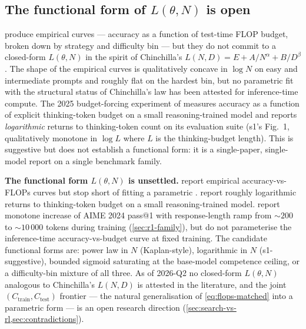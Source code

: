 \subsection{The functional form of \texorpdfstring{$L(\theta, N)$}{L(theta,N)} is open}
\label{sec:snell-open}

\citet{snell2024} produce empirical curves --- accuracy as a function
of test-time FLOP budget, broken down by strategy and difficulty bin
\citep[\S 5--6]{snell2024} --- but they do not commit to a closed-form
$L(\theta, N)$ in the spirit of Chinchilla's
$L(N, D) = E + A/N^\alpha + B/D^\beta$
\citep[\S 3, Eq.~2]{hoffmann2022-chinchilla}. The shape of the
empirical curves is qualitatively concave in $\log N$ on easy and
intermediate prompts and roughly flat on the hardest bin, but no
parametric fit with the structural status of Chinchilla's law has been
attested for inference-time compute. The 2025 budget-forcing experiment
of \citet{s1-2025} measures accuracy as a function of explicit
thinking-token budget on a small reasoning-trained model and reports
\emph{logarithmic} returns to thinking-token count on its evaluation
suite (s1's Fig.~1, qualitatively monotone in $\log L$ where $L$ is the
thinking-budget length). This is suggestive but does not establish a
functional form: it is a single-paper, single-model report on a single
benchmark family.

\begin{contradiction}
\textbf{The functional form $L(\theta, N)$ is unsettled.}
\citet{snell2024} report empirical accuracy-vs-FLOPs curves but stop
short of fitting a parametric . \citet{s1-2025} report
roughly logarithmic returns to thinking-token budget on a small
reasoning-trained model. \citet{deepseek-r1} report monotone increase
of AIME 2024 pass@1 with response-length ramp from $\sim 200$ to
$\sim 10\,000$ tokens during  training (\cref{sec:r1-family}), but
do not parameterise the inference-time accuracy-vs-budget curve at
fixed training. The candidate functional forms are: power law in $N$
(Kaplan-style), logarithmic in $N$ (s1-suggestive), bounded sigmoid
saturating at the base-model competence ceiling, or a difficulty-bin
mixture of all three. As of 2026-Q2 no closed-form $L(\theta, N)$
analogous to Chinchilla's $L(N, D)$ is attested in the literature, and
the joint $(C_\text{train}, C_\text{test})$ frontier --- the natural
generalisation of \cref{eq:flops-matched} into a parametric form --- is
an open research direction (\cref{sec:search-vs-rl,sec:contradictions}).
\end{contradiction}

